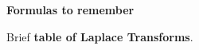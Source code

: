\documentclass[11pt]{article}
\begin{document}
\begin{preamble}

\textbf{Formulas to remember}

\begin{formulaitem}
 
% 
% 

\item Brief \textbf{table of Laplace Transforms}.


\end{formulaitem}
\end{preamble}
\end{document}
